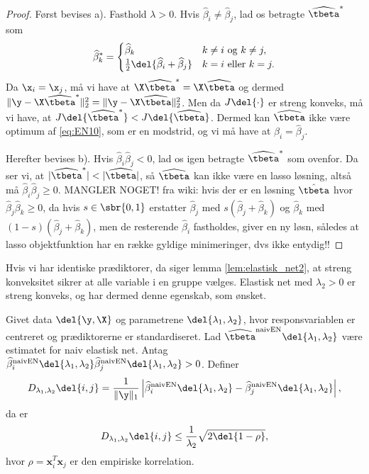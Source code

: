 \begin{proof}
Først bevises a).
Fasthold \(\lambda > 0\).
Hvis \(\widehat{\beta}_i \neq \widehat{\beta}_j\), lad os betragte \(\widehat{\tbeta}^*\) som
\begin{align*}
\widehat{\beta}_k^* = \begin{cases}
\widehat{\beta}_k & k \neq i \text{ og } k \neq j, \\
\frac{1}{2} \del{\widehat{\beta}_i + \widehat{\beta}_j} & k = i \text{ eller } k = j.
\end{cases}
\end{align*}
Da \(\x_i = \x_j\), må vi have at \(\X \widehat{\tbeta}^* = \X \widehat{\tbeta}\) og dermed \(\Vert \y - \X \widehat{\tbeta}^* \Vert_2^2 = \Vert \y - \X \widehat{\tbeta} \Vert_2^2\).
Men da \(J \del{\cdot}\) er streng konveks, må vi have, at \(J \del{\widehat{\tbeta}^*} < J \del{\widehat{\tbeta}}\).
Dermed kan \(\widehat{\tbeta}\) ikke være optimum af \eqref{eq:EN10}, som er en modstrid, og vi må have at \(\widehat{\beta}_i = \widehat{\beta}_j\).

Herefter bevises b).
Hvis \(\widehat{\beta}_i \widehat{\beta}_j < 0\), lad os igen betragte \(\widehat{\tbeta}^*\) som ovenfor.
Da ser vi, at \(\vert \widehat{\tbeta}^* \vert < \vert \widehat{\tbeta} \vert\), så \(\widehat{\tbeta}\) kan ikke være en lasso løsning, altså må \(\widehat{\beta}_i \widehat{\beta}_j \geq 0\).
MANGLER NOGET!
fra wiki: hvis der er en løsning \(\hat{\tbeta}\) hvor \(\hat{\beta}_j \hat{\beta}_k \geq 0\), da hvis \(s \in \sbr{0,1}\) erstatter \(\hat{\beta}_j\) med \(s (\hat{\beta}_j + \hat{\beta}_k)\) og \(\hat{\beta}_k\) med \( (1-s)(\hat{\beta}_j + \hat{\beta}_k)\), men de resterende \(\hat{\beta}_i\) fastholdes, giver en ny løsn, således at lasso objektfunktion har en række gyldige minimeringer, dvs ikke entydig!!   
\end{proof}
Hvis vi har identiske prædiktorer, da siger lemma \ref{lem:elastisk_net2}, at streng konveksitet sikrer at alle variable i en gruppe vælges.
Elastisk net med \(\lambda_2 > 0\) er streng konveks, og har dermed denne egenskab, som ønsket.
%
\begin{thm} \label{thm:elastisk_net}
Givet data \(\del{\y, \X}\) og parametrene \(\del{\lambda_1, \lambda_2}\), hvor responsvariablen er centreret og prædiktorerne er standardiseret.
Lad \(\widehat{\tbeta}^\text{naivEN} \del{\lambda_1, \lambda_2}\) være estimatet for naiv elastisk net.
Antag \(\widehat{\beta}^\text{naivEN}_i \del{\lambda_1, \lambda_2} \widehat{\beta}^\text{naivEN}_j \del{\lambda_1, \lambda_2} > 0\).
Definer
\begin{align*}
D_{\lambda_1, \lambda_2} \del{i,j} = \frac{1}{\Vert \y \Vert_1} \left\vert \widehat{\beta}^\text{naivEN}_i \del{\lambda_1, \lambda_2} - \widehat{\beta}^\text{naivEN}_j \del{\lambda_1, \lambda_2} \right\vert,
\end{align*}
da er
\begin{align}
D_{\lambda_1, \lambda_2} \del{i,j} \leq \frac{1}{\lambda_2} \sqrt{2 \del{1-\rho}}, \label{eq:EN5}
\end{align}
hvor \(\rho = \mathbf{x}_i^T \mathbf{x}_j\) er den empiriske korrelation.
\end{thm}
